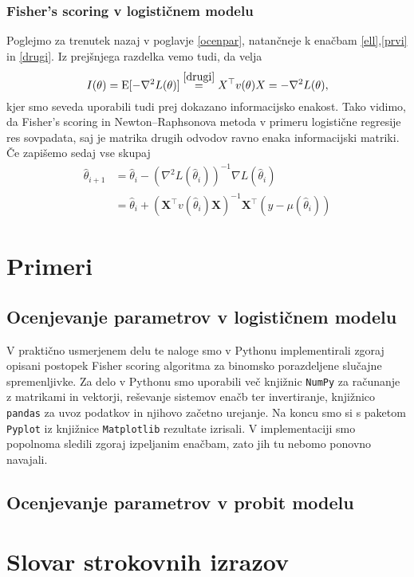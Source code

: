 \documentclass[12pt,a4paper]{amsart}
\theoremstyle{definition} %
\theoremstyle{plain} %
\newcommand{\geslo}[2]{\noindent\textbf{#1}\hspace*{3mm}\hangindent=\parindent\hangafter=1 #2}
\begin{document}
\subsubsection{Fisher's scoring v logističnem modelu}
Poglejmo za trenutek nazaj v poglavje \ref{ocenpar}, natančneje k enačbam \eqref{ell},\eqref{prvi} in \eqref{drugi}. Iz prejšnjega razdelka vemo tudi, da velja
\[
    I(\theta) = \mathrm{E}[-\nabla ^2 L(\theta)] \overset{\eqref{drugi}}{=} X^\top v(\theta)X = -\nabla ^2 L(\theta),
\]
kjer smo seveda uporabili tudi prej dokazano informacijsko enakost. Tako vidimo, da Fisher's scoring in Newton--Raphsonova metoda v primeru logistične regresije
res sovpadata, saj je matrika drugih odvodov ravno enaka informacijski matriki. Če zapišemo sedaj vse skupaj
\begin{align}
    \hat{\theta}_{i+1} &= \hat{\theta}_{i} - (\nabla^{2} L(\hat{\theta}_{i}))^{-1} \nabla L(\hat{\theta}_{i}) \nonumber \\
    &= \hat{\theta}_{i} + (\mathbf{X}^\top v(\hat{\theta}_{i}) \mathbf{X})^{-1}\mathbf{X}^\top(y - \mu(\hat{\theta}_{i})) 
\end{align}
\section{Primeri}
\subsection{Ocenjevanje parametrov v logističnem modelu}

V praktično usmerjenem delu te naloge smo v Pythonu implementirali zgoraj opisani postopek Fisher scoring algoritma za binomsko porazdeljene slučajne
spremenljivke. Za delo v Pythonu smo uporabili več knjižnic\; \texttt{NumPy} za računanje z matrikami in vektorji, reševanje sistemov enačb ter invertiranje,
knjižnico \texttt{pandas} za uvoz podatkov in njihovo začetno urejanje. Na koncu smo si s paketom \texttt{Pyplot} iz knjižnice \texttt{Matplotlib} rezultate izrisali.
V implementaciji smo popolnoma sledili zgoraj izpeljanim enačbam, zato jih tu nebomo ponovno navajali.
\subsection{Ocenjevanje parametrov v probit modelu}
\section*{Slovar strokovnih izrazov}
%
%
\nocite{*}


\end{document}
